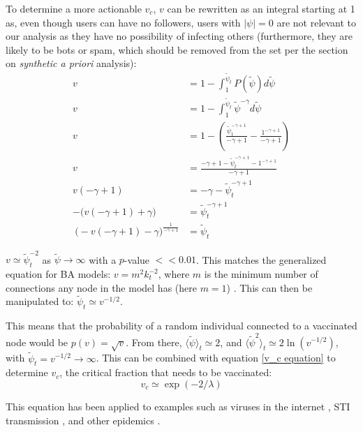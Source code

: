 \documentclass[preprint,review,12pt]{elsarticle}
\begin{document}
To determine a more actionable $v_c$, $v$ can be rewritten as an integral starting at 1 as, even though users can have no followers, users with $|\psi| = 0$ are not relevant to our analysis as they have no possibility of infecting others (furthermore, they are likely to be bots or spam, which should be removed from the set per the section on \textit{synthetic a priori} analysis):
\begin{equation}
\begin{split}
    v & = 1 - \int_1^{\tilde{\psi}_{t}} P(\tilde{\psi})d\tilde{\psi} \\
   v & = 1 - \int_1^{\tilde{\psi}_{t}} \tilde{\psi}^{-\gamma}d\tilde{\psi} \\
   v & = 1 - \left(\frac{\tilde{\psi}_{t}^{-\gamma +1}}{-\gamma+1}-\frac{1^{-\gamma +1}}{-\gamma+1}\right) \\
   v & = \frac{-\gamma+1 - \tilde{\psi}_{t}^{-\gamma +1} -  1^{-\gamma +1}}{-\gamma+1} \\
   v(-\gamma + 1) & = -\gamma - \tilde{\psi}_{t}^{-\gamma +1}\\
   -\big(v(-\gamma + 1) + \gamma\big) & = \tilde{\psi}_{t}^{-\gamma+1}\\\
   \big(-v(-\gamma + 1) - \gamma\big)^{\frac{1}{-\gamma + 1}} & = \tilde{\psi}_t
\end{split}
\end{equation}

$v \simeq \tilde{\psi}_t^{-2}$ as $\tilde{\psi} \rightarrow \infty$ with a $p$-value $<< 0.01$. This matches the generalized equation for BA models: $v = m^2k_t^{-2}$, where $m$ is the minimum number of connections any node in the model has (here $m = 1$) \citep{pastor2001epidemic}. This can then be manipulated to: $\tilde{\psi}_t \simeq v^{-1/2}$. 

This means that the probability of a random individual connected to a vaccinated node would be $p(v) = \sqrt{v}$. From there, $\langle \tilde{\psi} \rangle_t \simeq 2$, and $\langle \tilde{\psi}^2 \rangle_t \simeq 2 \ln(v^{-1/2})$, with $\tilde{\psi}_t = v^{-1/2} \rightarrow \infty$. This can be combined with equation \ref{v_c equation} to determine $v_c$, the critical fraction that needs to be vaccinated:
\begin{equation}
\label{reduced v_c} 
    v_c \simeq \exp{(-2/\lambda)}
\end{equation}

This equation has  been applied to examples such as viruses in the internet \citep{kephart1993computers}, STI transmission \citep{anderson1992infectious,lloyd2001viruses}, and other epidemics \citep{diekmann2000mathematical}. 
\end{document}
